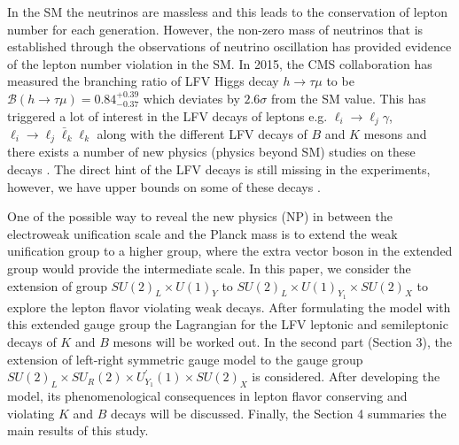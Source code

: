 \documentclass{ws-ijmpa}
\begin{document}
In the SM the neutrinos are massless and this leads to the conservation of lepton number for each generation. 
However, the non-zero mass of neutrinos that is established through the observations of neutrino oscillation has provided evidence of the lepton number violation in the SM. In 2015, the CMS collaboration \cite{CMS} has measured the branching ratio of LFV Higgs decay $h \to \tau \mu$ to be $\mathcal{B}(h\to \tau \mu) = 0.84^{+0.39}_{-0.37}$ which deviates by $2.6\sigma$ from the SM value. This has triggered a lot of interest in the LFV decays of leptons e.g. $\ell_{i} \to \ell_{j} \gamma$, $\ell_{i} \to \ell_{j}\bar{\ell}_{k}\ell_{k}$ along with the different LFV decays of $B$ and $K$ mesons and there exists a number of new physics (physics beyond SM) studies on these decays \cite{LFVdecays}. The direct hint of the LFV decays is still missing in the experiments, however, we have upper bounds on some of these decays \cite{pdg}.

One of the possible way to reveal the new physics (NP) in between the electroweak unification scale   and the Planck mass is to extend the weak unification group to a higher group,  where the extra vector boson in the extended group would provide the intermediate scale. 
In this paper, we consider the extension of group $SU(2)_L\times
U(1)_Y$ to $SU(2)_L\times U(1)_{Y_1}\times SU(2)_X$ to explore the lepton flavor violating weak decays. After formulating the model with this extended gauge group the Lagrangian for the LFV leptonic and semileptonic decays of $K$ and $B$ mesons will be worked out.  In the second part (Section 3), the extension of left-right symmetric gauge model to the gauge group $SU(2)_L\times SU_R(2)\times U^{\prime}_{Y_1}(1)\times SU(2)_X$ is considered. After developing the model, its phenomenological consequences in lepton flavor conserving and violating $K$ and $B$ decays will be discussed. Finally, the Section 4 summaries the main results of this study.
\end{document}
